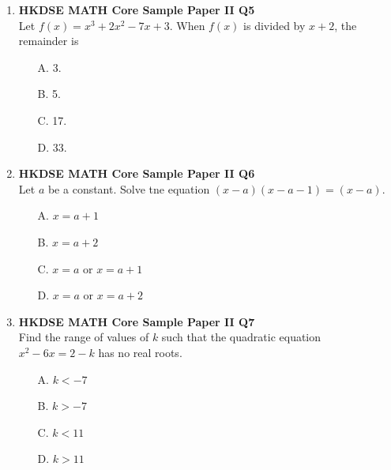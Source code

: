 \documentclass[12pt]{article}
\begin{document}
\begin{enumerate}
	\item \textbf{HKDSE MATH Core Sample Paper II Q5}\\
	Let $f(x) = x^3 + 2x^2 - 7x + 3$. When $f(x)$ is divided by $x + 2$, the remainder is 
	\begin{enumerate}
		\item[A.] 3.
		\item[B.] 5.
		\item[C.] 17.
		\item[D.] 33.
	\end{enumerate}

	\item \textbf{HKDSE MATH Core Sample Paper II Q6}\\
	Let $a$ be a constant. Solve tne equation $(x - a)(x - a - 1) = (x - a)$.
	\begin{enumerate}
		\item[A.] $x = a + 1$
		\item[B.] $x = a + 2$
		\item[C.] $x = a$ or $x = a + 1$
		\item[D.] $x = a$ or $x = a + 2$
	\end{enumerate}

	\item \textbf{HKDSE MATH Core Sample Paper II Q7}\\
	Find the range of values of $k$ such that the quadratic equation $x^2 - 6x = 2 - k$ has no real roots.
	\begin{enumerate}
		\item[A.] $k < -7$
		\item[B.] $k > -7$
		\item[C.] $k < 11$
		\item[D.] $k > 11$
	\end{enumerate}


\end{enumerate}
\end{document}

